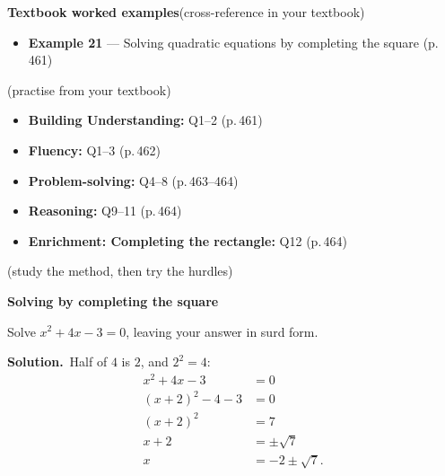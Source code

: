 \documentclass[11pt]{article}
\begin{document}
\begin{refbox}
{\bfseries\color{chalkdk}Textbook worked examples}\;\textcolor{inksoft}{\small(cross-reference in your textbook)}\\[3pt]
\begin{itemize}[leftmargin=16pt,itemsep=1pt,topsep=2pt]
  \item \textbf{Example 21} --- Solving quadratic equations by completing the square \textcolor{inksoft}{(p.\,461)}
\end{itemize}
\;\textcolor{inksoft}{\small(practise from your textbook)}\\[3pt]
\begin{itemize}[leftmargin=16pt,itemsep=1pt,topsep=2pt]
  \item \textbf{Building Understanding:} Q1--2 \textcolor{inksoft}{(p.\,461)}
  \item \textbf{Fluency:} Q1--3 \textcolor{inksoft}{(p.\,462)}
  \item \textbf{Problem-solving:} Q4--8 \textcolor{inksoft}{(p.\,463--464)}
  \item \textbf{Reasoning:} Q9--11 \textcolor{inksoft}{(p.\,464)}
  \item \textbf{Enrichment: Completing the rectangle:} Q12 \textcolor{inksoft}{(p.\,464)}
\end{itemize}\end{refbox}

\;\textcolor{inksoft}{\small(study the method, then try the hurdles)}\par

\begin{workedbox}

{\bfseries\color{chalkdk}Solving by completing the square}\par\vspace{3pt}

Solve $x^2+4x-3=0$, leaving your answer in surd form.\par\vspace{2pt}

{\bfseries Solution.}\ Half of $4$ is $2$, and $2^2=4$: \begin{align*}x^2+4x-3&=0\\(x+2)^2-4-3&=0\\(x+2)^2&=7\\x+2&=\pm\sqrt7\\x&=-2\pm\sqrt7.\end{align*}

\end{workedbox}
\end{document}
